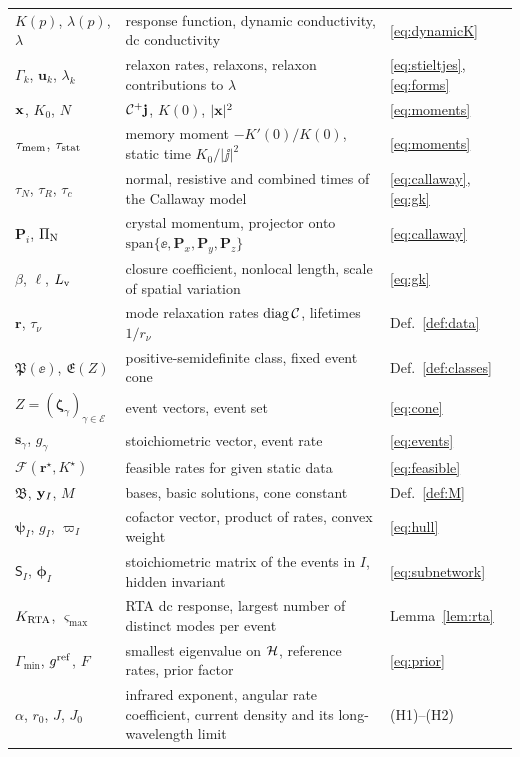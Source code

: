 \begin{table}[tbp]
\begin{ruledtabular}
\begin{tabular}{p{}p{}p{}}
$K(p)$, $\lambda(p)$, $\lambda$ & response function, dynamic conductivity, dc conductivity & \eqref{eq:dynamicK}\\
$\Gamma_k$, $\mathbf u_k$, $\lambda_k$ & relaxon rates, relaxons, relaxon contributions to $\lambda$ & \eqref{eq:stieltjes}, \eqref{eq:forms}\\
$\mathbf x$, $K_0$, $N$ & $\mathcal C^+\mathbf j$, $K(0)$, $|\mathbf x|^2$ & \eqref{eq:moments}\\
$\tau_{\rm mem}$, $\tau_{\rm stat}$ & memory moment $-K'(0)/K(0)$, static time $K_0/|\jj|^2$ & \eqref{eq:moments}\\
$\tau_N$, $\tau_R$, $\tau_c$ & normal, resistive and combined times of the Callaway model & \eqref{eq:callaway}, \eqref{eq:gk}\\
$\mathbf P_i$, $\Pi_{\rm N}$ & crystal momentum, projector onto $\mathrm{span}\{\ee,\mathbf P_x,\mathbf P_y,\mathbf P_z\}$ & \eqref{eq:callaway}\\
$\beta$, $\ell$, $L_{\rm v}$ & closure coefficient, nonlocal length, scale of spatial variation & \eqref{eq:gk}\\
$\mathbf r$, $\tau_\nu$ & mode relaxation rates $\mathrm{diag}\,\mathcal C$, lifetimes $1/r_\nu$ & Def.~\ref{def:data}\\
$\mathfrak P(\ee)$, $\mathfrak E(Z)$ & positive-semidefinite class, fixed event cone & Def.~\ref{def:classes}\\
$Z=(\bm\zeta_\gamma)_{\gamma\in\mathcal E}$ & event vectors, event set & \eqref{eq:cone}\\
$\mathbf s_\gamma$, $g_\gamma$ & stoichiometric vector, event rate & \eqref{eq:events}\\
$\mathcal F(\mathbf r^\star,K^\star)$ & feasible rates for given static data & \eqref{eq:feasible}\\
$\mathfrak B$, $\mathbf y_I$, $M$ & bases, basic solutions, cone constant & Def.~\ref{def:M}\\
$\bm\psi_I$, $g_I$, $\varpi_I$ & cofactor vector, product of rates, convex weight & \eqref{eq:hull}\\
$\mathsf S_I$, $\bm\phi_I$ & stoichiometric matrix of the events in $I$, hidden invariant & \eqref{eq:subnetwork}\\
$K_{\rm RTA}$, $\varsigma_{\max}$ & RTA dc response, largest number of distinct modes per event & Lemma~\ref{lem:rta}\\
$\Gamma_{\min}$, $g^{\rm ref}$, $F$ & smallest eigenvalue on $\mathcal H$, reference rates, prior factor & \eqref{eq:prior}\\
$\alpha$, $r_0$, $J$, $J_0$ & infrared exponent, angular rate coefficient, current density and its long-wavelength limit & (H1)--(H2)\\

\end{tabular}
\end{ruledtabular}
\end{table}
